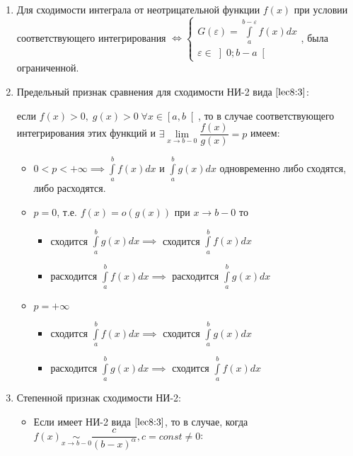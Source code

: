 \documentclass[../../main.tex]{subfiles}
\begin{document}
\begin{enumerate}
 \item[1.] Для сходимости интеграла от неотрицательной функции $f(x)$ при условии соответствующего интегрирования $\iff \begin{cases}
 G(\varepsilon) = \displaystyle\int\limits_{a}^{b - \varepsilon}f(x)dx\\
 \varepsilon \in \left]0; b - a\right[
 \end{cases}$, была ограниченной.
 
 \item[2.] Предельный признак сравнения для сходимости НИ-2 вида $\eqref{lec8:3}$:
 
 если $f(x) > 0,\; g(x) > 0\; \forall x \in \left[a, b\right[$, то в случае соответствующего интегрирования этих функций и $\exists \underset{x \to b - 0}\lim\dfrac{f(x)}{g(x)} = p$ имеем:
 \begin{itemize}
  \item[a)] $0 < p < +\infty \implies \displaystyle\int\limits_{a}^{b}f(x)dx$ и $\displaystyle\int\limits_{a}^{b}g(x)dx$ одновременно либо сходятся, либо расходятся.
  \item[б)] $p = 0$, т.е. $f(x) = o(g(x))$ при $x \to b - 0$ то
  \begin{itemize}
   \item[] сходится $\displaystyle\int\limits_{a}^{b}g(x)dx \implies $ сходится $\displaystyle\int\limits_{a}^{b}f(x)dx$
   \item[] расходится $\displaystyle\int\limits_{a}^{b}f(x)dx \implies $ расходится $\displaystyle\int\limits_{a}^{b}g(x)dx$
  \end{itemize}
  \item[в)] $p = +\infty$
    \begin{itemize}
     \item[] сходится $\displaystyle\int\limits_{a}^{b}f(x)dx \implies $ сходится $\displaystyle\int\limits_{a}^{b}g(x)dx$
     \item[] расходится $\displaystyle\int\limits_{a}^{b}g(x)dx \implies $ сходится $\displaystyle\int\limits_{a}^{b}f(x)dx$
    \end{itemize}
 \end{itemize}
 \item[3.] Степенной признак сходимости НИ-2:
 \begin{itemize}
 \item[] Если имеет НИ-2 вида $\eqref{lec8:3}$, то в случае, когда $f(x) \underset{x \to b - 0}\sim \dfrac{c}{(b - x)^ {\alpha}}, c = const \neq 0$:


\end{itemize}
\end{enumerate}
\end{document}
